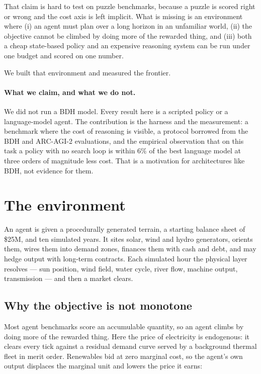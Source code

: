 \documentclass{article}
\begin{document}
That claim is hard to test on puzzle benchmarks, because a puzzle is scored
right or wrong and the cost axis is left implicit. What is missing is an
environment where (i) an agent must plan over a long horizon in an unfamiliar
world, (ii) the objective cannot be climbed by doing more of the rewarded thing,
and (iii) both a cheap state-based policy and an expensive reasoning system can
be run under one budget and scored on one number.

We built that environment and measured the frontier.

\paragraph{What we claim, and what we do not.} We did not run a BDH model.
Every result here is a scripted policy or a language-model agent. The
contribution is the harness and the measurement: a benchmark where the
cost of reasoning is visible, a protocol borrowed from the BDH and ARC-AGI-2
evaluations, and the empirical observation that on this task a policy with no
search loop is within $6\%$ of the best language model at three orders of
magnitude less cost. That is a motivation for architectures like BDH, not
evidence for them.

\section{The environment}

An agent is given a procedurally generated terrain, a starting balance sheet of
\$25M, and ten simulated years. It sites solar, wind and hydro generators,
orients them, wires them into demand zones, finances them with cash and debt,
and may hedge output with long-term contracts. Each simulated hour the physical
layer resolves --- sun position, wind field, water cycle, river flow, machine
output, transmission --- and then a market clears.

\subsection{Why the objective is not monotone}

Most agent benchmarks score an accumulable quantity, so an agent climbs by doing
more of the rewarded thing. Here the price of electricity is endogenous: it
clears every tick against a residual demand curve served by a background thermal
fleet in merit order. Renewables bid at zero marginal cost, so the agent's own
output displaces the marginal unit and lowers the price it earns:
\end{document}
